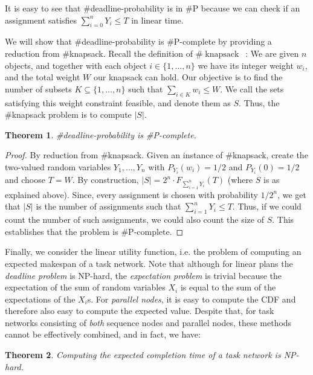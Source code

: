 \documentclass[review]{elsarticle}
\newtheorem{theorem}{Theorem}
\begin{document}
It is easy to see that \#deadline-probability is in \#P because we can check if an assignment satisfies $\sum_{i=0}^{n} Y_{i} \leq T$ in linear time.

We will show that \#deadline-probability is \#P-complete by providing a reduction from \#knapsack. Recall the definition of $\#\operatorname{knapsack}$~\cite{arora2009computational}: We are given $n$ objects, and together with each object $i\in \{1,\dots , n\}$ we have its integer weight $w_i$, and the total weight $W$ our knapsack can hold. Our objective is to find the number of subsets $K \subseteq \{1, \dots , n\}$ such that $\sum_{i \in K} w_i \leq W$. We call the sets satisfying this weight constraint feasible, and denote them as $S$. Thus, the \#knapsack problem is to compute $|S|$.

\begin{theorem} \label{deadlinSP}
\#deadline-probability is \#P-complete.
\end{theorem}

\begin{proof} By reduction from \#knapsack. Given an instance of \#knapsack, create the two-valued random variables $Y_{1},\dots,Y_{n} $ with $P_{Y_i}(w_i)=1/2$ and $P_{Y_i}(0)=1/2$ and choose $T=W$. By construction, $|S|=2^n \cdot F_{\sum_{i=1}^{n} Y_{i}}(T)$ (where $S$ is as explained above). Since, every assignment is chosen with probability $1/2^n$, we get that $|S|$ is the number of assignments such that $\sum_{i=1}^{n} Y_{i} \leq T$. Thus, if we could count the number of such assignments, we could also count the size of $S$. This establishes that the problem is \#P-complete. 
\end{proof}

Finally, we consider the linear utility function, i.e. the problem of computing an expected makespan of a task network.
Note that although for linear plans the {\em deadline problem} is NP-hard, the {\em expectation problem} is trivial because the expectation
of the sum of random variables  $X_i$ is equal to the sum of the expectations of the $X_i$s.
For {\em parallel nodes}, it is easy to compute the CDF and therefore also easy to
compute the expected value.
Despite that, for task networks consisting of {\em  both} sequence nodes and
parallel nodes, these methods cannot be effectively combined, and in fact, we have:
\begin{theorem}
Computing the expected completion time of a task network is NP-hard.
\end{theorem}
\end{document}
